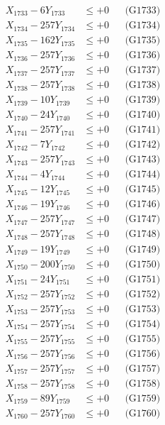 \documentclass[a4paper,10pt]{article}
\begin{document}
{\begin{align}
X_{1733} - 6Y_{1733} &\leq +0 && \text{(G1733)} \\
X_{1734} - 257Y_{1734} &\leq +0 && \text{(G1734)} \\
X_{1735} - 162Y_{1735} &\leq +0 && \text{(G1735)} \\
X_{1736} - 257Y_{1736} &\leq +0 && \text{(G1736)} \\
X_{1737} - 257Y_{1737} &\leq +0 && \text{(G1737)} \\
X_{1738} - 257Y_{1738} &\leq +0 && \text{(G1738)} \\
X_{1739} - 10Y_{1739} &\leq +0 && \text{(G1739)} \\
X_{1740} - 24Y_{1740} &\leq +0 && \text{(G1740)} \\
\allowbreak
X_{1741} - 257Y_{1741} &\leq +0 && \text{(G1741)} \\
X_{1742} - 7Y_{1742} &\leq +0 && \text{(G1742)} \\
X_{1743} - 257Y_{1743} &\leq +0 && \text{(G1743)} \\
X_{1744} - 4Y_{1744} &\leq +0 && \text{(G1744)} \\
X_{1745} - 12Y_{1745} &\leq +0 && \text{(G1745)} \\
X_{1746} - 19Y_{1746} &\leq +0 && \text{(G1746)} \\
X_{1747} - 257Y_{1747} &\leq +0 && \text{(G1747)} \\
X_{1748} - 257Y_{1748} &\leq +0 && \text{(G1748)} \\
X_{1749} - 19Y_{1749} &\leq +0 && \text{(G1749)} \\
X_{1750} - 200Y_{1750} &\leq +0 && \text{(G1750)} \\
\allowbreak
X_{1751} - 24Y_{1751} &\leq +0 && \text{(G1751)} \\
X_{1752} - 257Y_{1752} &\leq +0 && \text{(G1752)} \\
X_{1753} - 257Y_{1753} &\leq +0 && \text{(G1753)} \\
X_{1754} - 257Y_{1754} &\leq +0 && \text{(G1754)} \\
X_{1755} - 257Y_{1755} &\leq +0 && \text{(G1755)} \\
X_{1756} - 257Y_{1756} &\leq +0 && \text{(G1756)} \\
X_{1757} - 257Y_{1757} &\leq +0 && \text{(G1757)} \\
X_{1758} - 257Y_{1758} &\leq +0 && \text{(G1758)} \\
X_{1759} - 89Y_{1759} &\leq +0 && \text{(G1759)} \\
X_{1760} - 257Y_{1760} &\leq +0 && \text{(G1760)} \\

\end{align}}
\end{document}
